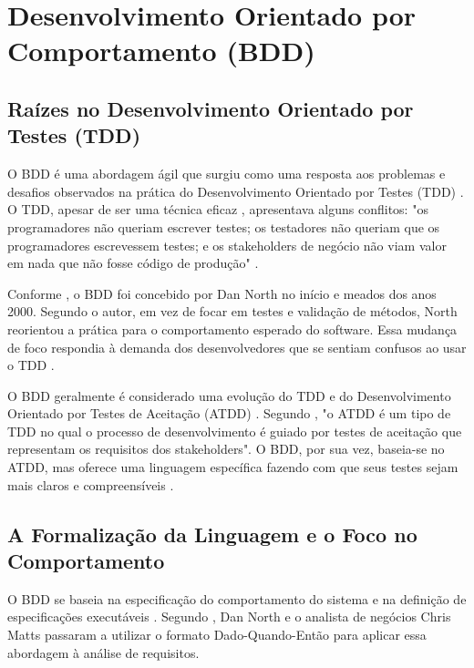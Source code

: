 \section{Desenvolvimento Orientado por Comportamento (BDD)}

\subsection{Raízes no Desenvolvimento Orientado por Testes (TDD)}

O BDD é uma abordagem ágil que surgiu como uma resposta aos problemas e desafios observados na prática do Desenvolvimento Orientado por Testes (TDD) \cite{Solis2011}. O TDD, apesar de ser uma técnica eficaz \cite{smart2014bdd}, apresentava alguns conflitos: "os programadores não queriam escrever testes; os testadores não queriam que os programadores escrevessem testes; e os stakeholders de negócio não viam valor em nada que não fosse código de produção" \cite[p.~xviii, tradução nossa]{smart2014bdd}.

Conforme , o BDD foi concebido por Dan North no início e meados dos anos 2000. Segundo o autor, em vez de focar em testes e validação de métodos, North reorientou a prática para o comportamento esperado do software. Essa mudança de foco respondia à demanda dos desenvolvedores que se sentiam confusos ao usar o TDD \cite{Solis2011}.

O BDD geralmente é considerado uma evolução do TDD e do Desenvolvimento Orientado por Testes de Aceitação (ATDD) \cite{Solis2011}. Segundo , "o ATDD é um tipo de TDD no qual o processo de desenvolvimento é guiado por testes de aceitação que representam os requisitos dos stakeholders". O BDD, por sua vez, baseia-se no ATDD, mas oferece uma linguagem específica fazendo com que seus testes sejam mais claros e compreensíveis \cite{Solis2011}.

\subsection{A Formalização da Linguagem e o Foco no Comportamento}

O BDD se baseia na especificação do comportamento do sistema e na definição de especificações executáveis \cite{Solis2011}. Segundo , Dan North e o analista de negócios Chris Matts passaram a utilizar o formato Dado-Quando-Então para aplicar essa abordagem à análise de requisitos. 

